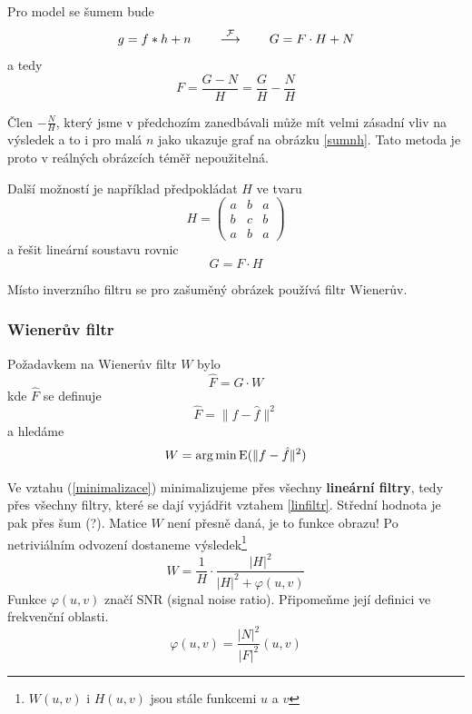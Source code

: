 
Pro model se šumem bude
\begin{equation}
g = f \ast h+n\label{eqv4} \qquad \stackrel{\operatorname{\mathcal{F}}}{\longrightarrow} \qquad G = F\cdot H+N
\end{equation}
a tedy 
\begin{equation}
F = \frac{G-N}{H}=\frac{G}{H}-\frac{N}{H}\label{eqv6}
\end{equation}

Člen $-\frac{N}{H}$, který jsme v předchozím zanedbávali může mít velmi zásadní vliv na výsledek a to i pro malá $n$ jako
ukazuje graf na obrázku \ref{sumnh}. Tato metoda je proto v reálných obrázcích téměř nepoužitelná.

Další možností je například předpokládat $H$ ve tvaru 
\begin{equation}
H = \left(\begin{array}{ccc}a&b&a\\b&c&b\\a&b&a\end{array}\right)
\end{equation}
a řešit lineární soustavu rovnic
\begin{equation}
G = F\cdot H
\end{equation}

Místo inverzního filtru se pro zašuměný obrázek používá filtr Wienerův.

\subsubsection{Wienerův filtr}
Požadavkem na Wienerův filtr $W$ bylo 
\begin{equation}
\hat{F}=G\cdot W \label{linfiltr}
\end{equation}
kde $\hat{F}$ se definuje
\begin{equation}
\hat{F}=\|f-\hat{f}\|^2
\end{equation}
a hledáme
\begin{equation}
W=\arg \min \operatorname{E} (\|f-\hat{f}\|^2)\label{minimalizace}
\end{equation}

Ve vztahu (\ref{minimalizace}) minimalizujeme přes všechny \textbf{lineární filtry}, tedy přes všechny filtry, které se dají vyjádřit vztahem \eqref{linfiltr}. Střední hodnota je pak přes šum (?). Matice $W$ není přesně daná, je to funkce obrazu!
Po netriviálním odvození dostaneme výsledek\footnote{$ W (u,v) $ i $ H (u,v) $ jsou stále funkcemi $ u$ a $v $}
\begin{equation}
W = \frac{1}{H}\cdot\frac{|H|^2}{|H|^2+\varphi(u,v)}
\end{equation}
Funkce $\varphi(u,v)$ značí SNR (signal noise ratio). Připomeňme její definici ve frekvenční oblasti.
\begin{equation}
\varphi (u,v) = \frac{|N|^2}{|F|^2} (u,v)
\end{equation}

